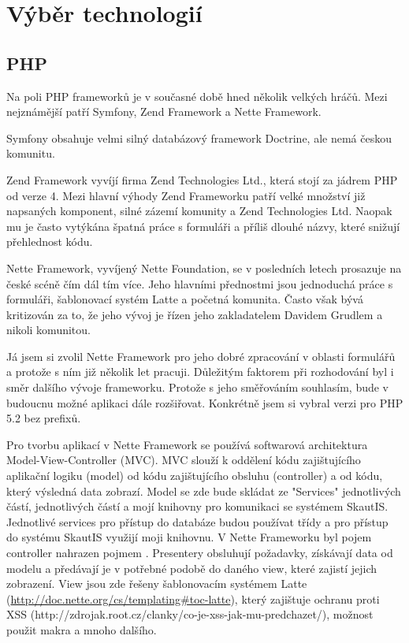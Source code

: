 \documentclass[thesis=B,czech]{FITthesis}[2011/06/14]
\begin{document}
\section{Výběr technologií}
\subsection{PHP}
Na poli PHP frameworků je v současné době hned několik velkých hráčů. Mezi nejznámější patří Symfony, Zend Framework a Nette Framework.

Symfony obsahuje velmi silný databázový framework Doctrine, ale nemá českou komunitu.

Zend Framework vyvíjí firma Zend Technologies Ltd., která stojí za jádrem PHP od verze 4. Mezi hlavní výhody Zend Frameworku patří velké množství již napsaných komponent, silné zázemí komunity a Zend Technologies Ltd. Naopak mu je často vytýkána špatná práce s formuláři a příliš dlouhé názvy, které snižují přehlednost kódu. 

Nette Framework, vyvíjený Nette Foundation, se v posledních letech prosazuje na české scéně čím dál tím více. Jeho hlavními přednostmi jsou jednoduchá práce s formuláři, šablonovací systém Latte a početná komunita. Často však bývá kritizován za to, že jeho vývoj je řízen jeho zakladatelem Davidem Grudlem a nikoli komunitou.

Já jsem si zvolil Nette Framework pro jeho dobré zpracování v oblasti formulářů a protože s ním již několik let pracuji. Důležitým faktorem při rozhodování byl i směr dalšího vývoje frameworku. Protože s jeho směřováním souhlasím, bude v budoucnu možné aplikaci dále rozšiřovat. Konkrétně jsem si vybral verzi pro PHP 5.2 bez prefixů.

Pro tvorbu aplikací v Nette Framework se používá softwarová architektura Model-View-Controller (MVC). MVC slouží k oddělení kódu zajištujícího aplikační logiku (model) od kódu zajištujícího obsluhu (controller) a od kódu, který výsledná data zobrazí.
Model se zde bude skládat ze "Services" jednotlivých částí,  jednotlivých částí a mojí knihovny pro komunikaci se systémem SkautIS. Jednotlivé services pro přístup do databáze budou používat třídy  a pro přístup do systému SkautIS využijí moji knihovnu.
V Nette Frameworku byl pojem controller nahrazen pojmem . Presentery obsluhují požadavky, získávají data od modelu a předávají je v potřebné podobě do daného view, které zajistí jejich zobrazení.
View jsou zde řešeny šablonovacím systémem Latte (\url{http://doc.nette.org/cs/templating#toc-latte}), který zajištuje ochranu proti XSS (http://zdrojak.root.cz/clanky/co-je-xss-jak-mu-predchazet/), možnost použit makra a mnoho dalšího.  
\end{document}
